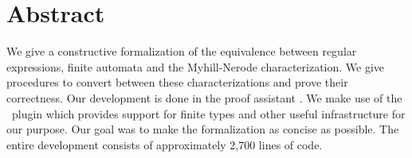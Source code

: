 \chapter*{Abstract}
\label{chap:abstract}


We give a constructive formalization of the equivalence between regular expressions, finite automata and the Myhill-Nerode characterization. 
We give procedures to convert between these characterizations and prove their correctness.
Our development is done in the proof assistant \coq.
We make use of the \ssreflect\ plugin which provides support for finite types and other useful infrastructure for our purpose.
Our goal was to make the formalization as concise as possible.
The entire development consists of approximately 2,700 lines of code.
